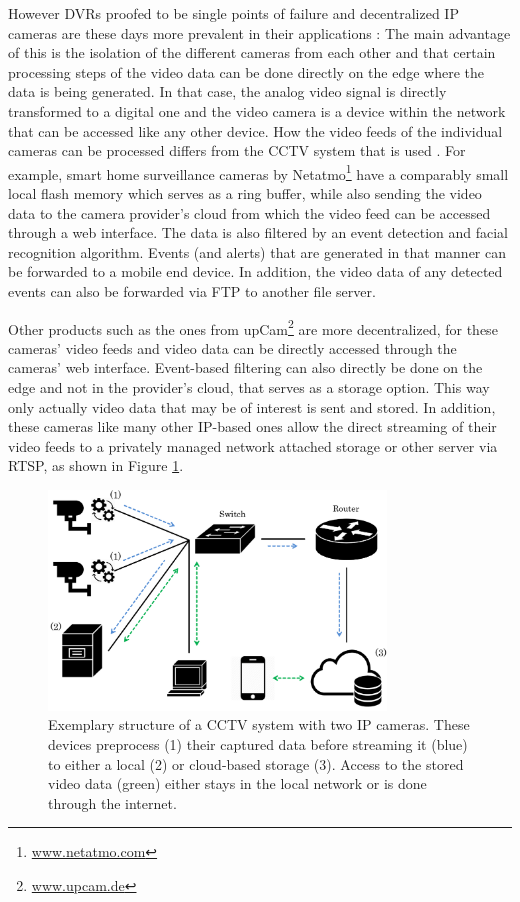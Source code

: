 However DVRs proofed to be single points of failure and decentralized IP cameras are these days more prevalent in their applications \cite{vlahos2009surveillance, ferenbok2013hidden}: The main advantage of this is the isolation of the different cameras from each other and that certain processing steps of the video data can be done directly on the edge where the data is being generated. In that case, the analog video signal is directly transformed to a digital one and the video camera is a device within the network that can be accessed like any other device. How the video feeds of the individual cameras can be processed differs from the CCTV system that is used \cite{fleck2010privacy}. For example, smart home surveillance cameras by Netatmo\footnote{\url{www.netatmo.com}} have a comparably small local flash memory which serves as a ring buffer, while also sending the video data to the camera provider's cloud from which the video feed can be accessed through a web interface. The data is also filtered by an event detection and facial recognition algorithm. Events (and alerts) that are generated in that manner can be forwarded to a mobile end device. In addition, the video data of any detected events can also be forwarded via FTP to another file server. 

Other products such as the ones from upCam\footnote{\url{www.upcam.de}} are more decentralized, for these cameras' video feeds and video data can be directly accessed through the cameras' web interface. Event-based filtering can also directly be done on the edge and not in the provider's cloud, that serves as a storage option. This way only actually video data that may be of interest is sent and stored. In addition, these cameras like many other IP-based ones allow the direct streaming of their video feeds to a privately managed network attached storage or other server via RTSP, as shown in Figure \ref{fig:cctv_system}.\\

\begin{figure}
	\centering
	\includegraphics[width=0.8\textwidth]{graphics/cctv/cctvSystem/cctvSystem.pdf}
  \caption[Exemplary structure of a CCTV system.]{Exemplary structure of a CCTV system with two IP cameras. These devices preprocess (1) their captured data before streaming it (blue) to either a local (2) or cloud-based storage (3). Access to the stored video data (green) either stays in the local network or is done through the internet.}
  \label{fig:cctv_system}
\end{figure}

